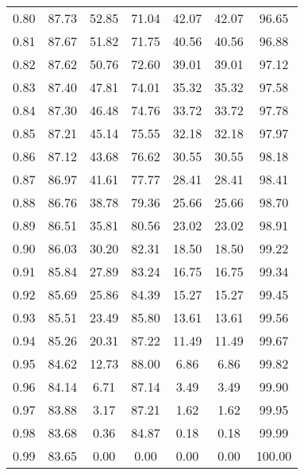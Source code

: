 \begin{tabular}{|c|c|c|c|c|c|c|}
      0.80 &     87.73 &     52.85 &      71.04 &   42.07 &      42.07 &         96.65 \\
      0.81 &     87.67 &     51.82 &      71.75 &   40.56 &      40.56 &         96.88 \\
      0.82 &     87.62 &     50.76 &      72.60 &   39.01 &      39.01 &         97.12 \\
      0.83 &     87.40 &     47.81 &      74.01 &   35.32 &      35.32 &         97.58 \\
      0.84 &     87.30 &     46.48 &      74.76 &   33.72 &      33.72 &         97.78 \\
      0.85 &     87.21 &     45.14 &      75.55 &   32.18 &      32.18 &         97.97 \\
      0.86 &     87.12 &     43.68 &      76.62 &   30.55 &      30.55 &         98.18 \\
      0.87 &     86.97 &     41.61 &      77.77 &   28.41 &      28.41 &         98.41 \\
      0.88 &     86.76 &     38.78 &      79.36 &   25.66 &      25.66 &         98.70 \\
      0.89 &     86.51 &     35.81 &      80.56 &   23.02 &      23.02 &         98.91 \\
      0.90 &     86.03 &     30.20 &      82.31 &   18.50 &      18.50 &         99.22 \\
      0.91 &     85.84 &     27.89 &      83.24 &   16.75 &      16.75 &         99.34 \\
      0.92 &     85.69 &     25.86 &      84.39 &   15.27 &      15.27 &         99.45 \\
      0.93 &     85.51 &     23.49 &      85.80 &   13.61 &      13.61 &         99.56 \\
      0.94 &     85.26 &     20.31 &      87.22 &   11.49 &      11.49 &         99.67 \\
      0.95 &     84.62 &     12.73 &      88.00 &    6.86 &       6.86 &         99.82 \\
      0.96 &     84.14 &      6.71 &      87.14 &    3.49 &       3.49 &         99.90 \\
      0.97 &     83.88 &      3.17 &      87.21 &    1.62 &       1.62 &         99.95 \\
      0.98 &     83.68 &      0.36 &      84.87 &    0.18 &       0.18 &         99.99 \\
      0.99 &     83.65 &      0.00 &       0.00 &    0.00 &       0.00 &        100.00 \\
\bottomrule
\end{tabular}
